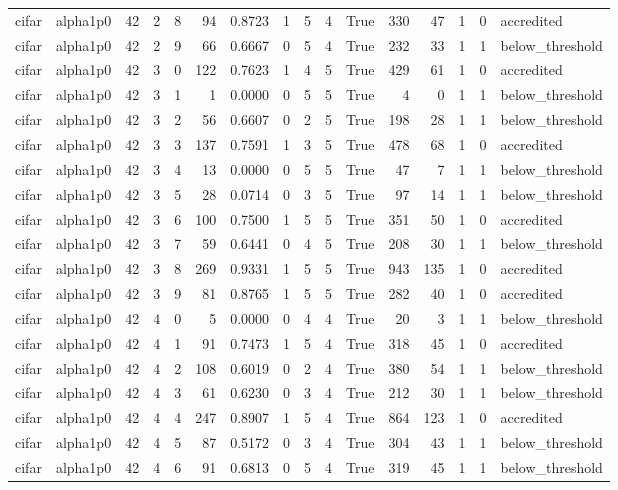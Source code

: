 \begin{tabular}{llrrrrrrrrrrrrrl}
cifar & alpha1p0 & 42 & 2 & 8 & 94 & 0.8723 & 1 & 5 & 4 & True & 330 & 47 & 1 & 0 & accredited \\
cifar & alpha1p0 & 42 & 2 & 9 & 66 & 0.6667 & 0 & 5 & 4 & True & 232 & 33 & 1 & 1 & below\_threshold \\
cifar & alpha1p0 & 42 & 3 & 0 & 122 & 0.7623 & 1 & 4 & 5 & True & 429 & 61 & 1 & 0 & accredited \\
cifar & alpha1p0 & 42 & 3 & 1 & 1 & 0.0000 & 0 & 5 & 5 & True & 4 & 0 & 1 & 1 & below\_threshold \\
cifar & alpha1p0 & 42 & 3 & 2 & 56 & 0.6607 & 0 & 2 & 5 & True & 198 & 28 & 1 & 1 & below\_threshold \\
cifar & alpha1p0 & 42 & 3 & 3 & 137 & 0.7591 & 1 & 3 & 5 & True & 478 & 68 & 1 & 0 & accredited \\
cifar & alpha1p0 & 42 & 3 & 4 & 13 & 0.0000 & 0 & 5 & 5 & True & 47 & 7 & 1 & 1 & below\_threshold \\
cifar & alpha1p0 & 42 & 3 & 5 & 28 & 0.0714 & 0 & 3 & 5 & True & 97 & 14 & 1 & 1 & below\_threshold \\
cifar & alpha1p0 & 42 & 3 & 6 & 100 & 0.7500 & 1 & 5 & 5 & True & 351 & 50 & 1 & 0 & accredited \\
cifar & alpha1p0 & 42 & 3 & 7 & 59 & 0.6441 & 0 & 4 & 5 & True & 208 & 30 & 1 & 1 & below\_threshold \\
cifar & alpha1p0 & 42 & 3 & 8 & 269 & 0.9331 & 1 & 5 & 5 & True & 943 & 135 & 1 & 0 & accredited \\
cifar & alpha1p0 & 42 & 3 & 9 & 81 & 0.8765 & 1 & 5 & 5 & True & 282 & 40 & 1 & 0 & accredited \\
cifar & alpha1p0 & 42 & 4 & 0 & 5 & 0.0000 & 0 & 4 & 4 & True & 20 & 3 & 1 & 1 & below\_threshold \\
cifar & alpha1p0 & 42 & 4 & 1 & 91 & 0.7473 & 1 & 5 & 4 & True & 318 & 45 & 1 & 0 & accredited \\
cifar & alpha1p0 & 42 & 4 & 2 & 108 & 0.6019 & 0 & 2 & 4 & True & 380 & 54 & 1 & 1 & below\_threshold \\
cifar & alpha1p0 & 42 & 4 & 3 & 61 & 0.6230 & 0 & 3 & 4 & True & 212 & 30 & 1 & 1 & below\_threshold \\
cifar & alpha1p0 & 42 & 4 & 4 & 247 & 0.8907 & 1 & 5 & 4 & True & 864 & 123 & 1 & 0 & accredited \\
cifar & alpha1p0 & 42 & 4 & 5 & 87 & 0.5172 & 0 & 3 & 4 & True & 304 & 43 & 1 & 1 & below\_threshold \\
cifar & alpha1p0 & 42 & 4 & 6 & 91 & 0.6813 & 0 & 5 & 4 & True & 319 & 45 & 1 & 1 & below\_threshold \\

\end{tabular}
